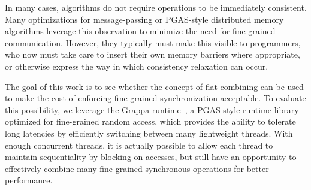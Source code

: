 In many cases, algorithms do not require operations to be immediately consistent. Many optimizations for message-passing or PGAS-style distributed memory algorithms leverage this observation to minimize the need for fine-grained communication. However, they typically must make this visible to programmers, who now must take care to insert their own memory barriers where appropriate, or otherwise express the way in which consistency relaxation can occur.

The goal of this work is to see whether the concept of flat-combining can be used to make the cost of enforcing fine-grained synchronization acceptable.
To evaluate this possibility, we leverage the Grappa runtime~\cite{Nelson:hotpar11-real}, a PGAS-style runtime library optimized for fine-grained random access, which provides the ability to tolerate long latencies by efficiently switching between many lightweight threads.
With enough concurrent threads, it is actually possible to allow each thread to maintain sequentiality by blocking on accesses, but still have an opportunity to effectively combine many fine-grained synchronous operations for better performance.

